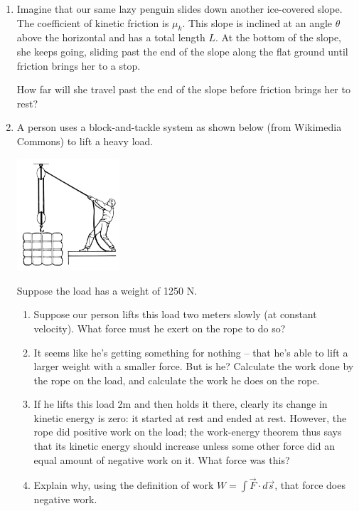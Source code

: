 \documentclass[12pt]{article}
\begin{document}
\begin{enumerate}
\item{Imagine that our same lazy penguin slides down another ice-covered slope. The coefficient of kinetic friction is $\mu_k$.
	This slope is inclined at an angle $\theta$ above the horizontal and has a total length $L$. At the bottom of the slope, she keeps going, sliding past the end of the slope along the flat ground until friction brings her to a stop.
	
	How far will she travel past the end of the slope before friction brings her to rest?}


\item{A person uses a block-and-tackle system as shown below (from Wikimedia Commons) to lift a heavy load.
	
	\includegraphics[width=0.3\textwidth]{blockandtackle.png}
	
	Suppose the load has a weight of 1250 N. 
	
	\begin{enumerate}
		\item{Suppose our person lifts this load two meters slowly (at constant velocity). What force must he exert on the rope to do so?} 
		\item{It seems like he's getting something for nothing -- that he's able to lift a larger weight with a smaller force. But is he? Calculate the work done by the rope on the load, and calculate the work he does on the rope.}
		\item{If he lifts this load 2m and then holds it there, clearly its change in kinetic energy is zero: it started at rest and ended at rest. However, the rope did positive work on the load; the work-energy theorem thus says that its kinetic energy should
			increase unless some other force did an equal amount of negative work on it. What force was this?}
		\item{Explain why, using the definition of work $W = \int \vec F \cdot d\vec s$, that force does negative work.}
	\end{enumerate}
}


\end{enumerate}
\end{document}
